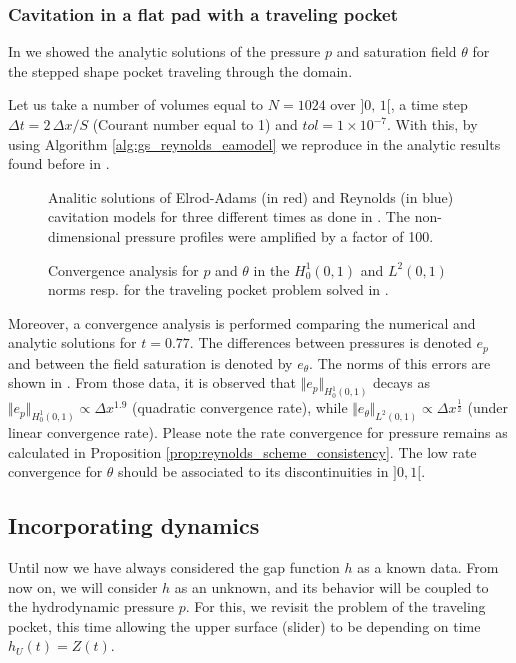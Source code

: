 \subsubsection*{Cavitation in a flat pad with a traveling pocket} 
In  we showed the analytic solutions of the pressure $p$ and saturation field $\theta$ for the stepped shape pocket traveling through the domain.

Let us take a number of volumes equal to $N=1024$ over $]0,\,1[$, a time step $\Delta t = 2\,
\Delta x /S$ (Courant number equal to 1) and $tol=1\times 10^{-7}$. With this, by using Algorithm \ref{alg:gs_reynolds_eamodel} we reproduce in  the analytic results found before in .
\begin{figure}[ht!]
 \centering 
 \def\svgwidth{\textwidth}	

\caption[Analitic solutions of Elrod-Adams and Reynolds cavitation models for three different times as done in ]{Analitic solutions of Elrod-Adams (in red) and Reynolds (in blue) cavitation models for three different times as done
 in . The non-dimensional pressure profiles were amplified by a factor of 100.}\label{fig:pockets_numerical}
\end{figure}
\begin{figure}[ht]
\centering 
\def\svgwidth{\textwidth}{
}\caption{
Convergence analysis for $p$ and $\theta$ in the $H^1_0(0,1)$ and $L^2(0,1)$ norms resp. for the traveling pocket problem solved in . 
}\label{fig:conv_p_pocket}
\end{figure} Moreover, a convergence analysis is performed comparing the numerical and analytic solutions for $t=0.77$. The differences between pressures is denoted $e_p$ and between the field saturation is denoted by $e_\theta$. The norms of this errors are shown in . From those data, it is observed that $\Vert e_p \Vert_{H^1_0(0,1)}$ decays as $\Vert e_p \Vert_{H^1_0(0,1)}\propto \Delta x ^{1.9}$ (quadratic convergence rate), while $\Vert e_\theta \Vert_{L^2(0,1)}\propto \Delta x ^\frac{1}{2}$ (under linear convergence rate). Please note the rate convergence for pressure remains as calculated in Proposition \ref{prop:reynolds_scheme_consistency}. The low rate convergence for $\theta$ should be associated to its discontinuities in $]0,1[$.

\subsection{Incorporating dynamics}
Until now we have always considered the gap function $h$ as a known data. From now on, we will consider $h$ as an unknown, and its behavior will be coupled to the hydrodynamic pressure $p$. For this, we revisit the problem of the traveling pocket, this time allowing the upper surface (slider) to be depending on time $h_U(t)=Z(t)$.


